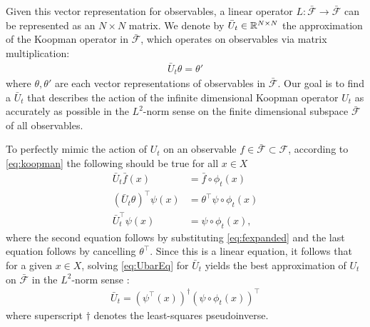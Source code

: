 Given this vector representation for observables, a linear operator $L : \bar{\mathcal{F}} \to \bar{\mathcal{F}}$ can be represented as an ${N \times N}$ matrix. 
We denote by $\bar{U}_t \in \mathbb{R}^{N \times N}$ the approximation of the Koopman operator in $\bar{\mathcal{F}}$, which operates on observables via matrix multiplication:
\begin{align}
    \bar{U}_t \theta = \theta'
\end{align}
where $\theta , \theta'$ are each vector representations of observables in $\bar{\mathcal{F}}$.
Our goal is to find a $\bar{U}_t$ that describes the action of the infinite dimensional Koopman operator $U_t$ as accurately as possible in the $L^2$-norm sense on the finite dimensional subspace $\bar{\mathcal{F}}$ of all observables.

To perfectly mimic the action of $U_t$ on an observable ${f \in \bar{\mathcal{F}} \subset \mathcal{F}}$, according to \eqref{eq:koopman} the following should be true for all  $x \in X$
\begin{align}
    \bar{U}_t \bar{f}(x) &= \bar{f} \circ \phi_t(x) \\
    ( \bar{U}_t {\theta} )^\top {\psi}(x) &=
    {\theta}^\top {\psi} \circ \phi_t(x) \\
    \bar{U}_t^\top \psi(x) &= {\psi} \circ \phi_t(x),
    \label{eq:UbarEq}
\end{align}
where the second equation follows by substituting \eqref{eq:fexpanded} and the last equation follows by cancelling $\theta^\top$.
Since this is a linear equation, it follows that for a given ${x \in X}$, solving \eqref{eq:UbarEq} for $\bar{U}_t$ yields the best approximation of $U_t$ on $\bar{\mathcal{F}}$ in the $L^2$-norm sense \cite{penrose1956best}:
\begin{align}
    \bar{U}_t = \left( {\psi}^\top(x) \right)^\dagger ( {\psi} \circ \phi_t(x) )^\top
    \label{eq:Uapprox}
\end{align}
where superscript $\dagger$ denotes the least-squares pseudoinverse.

